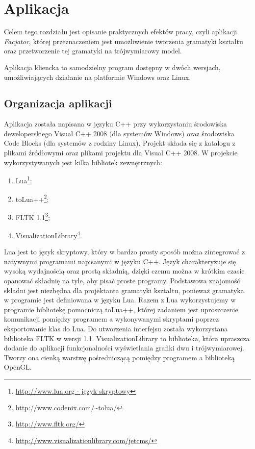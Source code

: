 \section{Aplikacja}
Celem tego rozdziału jest opisanie praktycznych efektów pracy, czyli
aplikacji \emph{Facjator}, której przeznaczeniem jest umożliwienie tworzenia
gramatyki kształtu oraz przetworzenie tej gramatyki na trójwymiarowy model.

Aplikacja kliencka to samodzielny program dostępny w dwóch wersjach,
umożliwiających działanie na platformie Windows oraz Linux.

\subsection{Organizacja aplikacji}
Aplikacja została napisana w języku C++ przy wykorzystaniu środowiska
deweloperskiego Visual C++ 2008 (dla systemów Windows) oraz środowiska Code
Blocks (dla systemów z rodziny Linux). Projekt składa się z katalogu z plikami
źródłowymi oraz plikami projektu dla Visual C++ 2008. 
W projekcie wykorzystywanych jest kilka bibliotek zewnętrznych:
\begin{enumerate}
  \item Lua\footnote{\url{http://www.lua.org - język skryptowy}};
  \item toLua++\footnote{\url{http://www.codenix.com/~tolua/}};
  \item FLTK 1.1\footnote{\url{http://www.fltk.org/}};
  \item
  VisualizationLibrary\footnote{\url{http://www.visualizationlibrary.com/jetcms/}}.
\end{enumerate}
Lua jest to język skryptowy, który w bardzo prosty sposób można zintegrować z
natywnymi programami napisanymi w języku C++. Język charakteryzuje się wysoką
wydajnością oraz prostą składnią, dzięki czemu można w krótkim czasie opanować
składnię na tyle, aby pisać proste programy. Podstawowa znajomość składni jest
niezbędna dla projektanta gramatyki kształtu, ponieważ gramatyka w programie
jest definiowana w języku Lua. Razem z Lua wykorzystujemy w programie bibliotekę
pomocniczą toLua++, której zadaniem jest uproszczenie komunikacji pomiędzy
programem a wykonywanymi skryptami poprzez eksportowanie klas do Lua. Do
utworzenia interfejsu została wykorzystana biblioteka FLTK w wersji 1.1.
VisualizationLibrary to biblioteka, która upraszcza dodanie do aplikacji
funkcjonalności wyświetlania grafiki dwu i trójwymiarowej. Tworzy ona cienką
warstwę pośredniczącą pomiędzy programem a biblioteką OpenGL.

